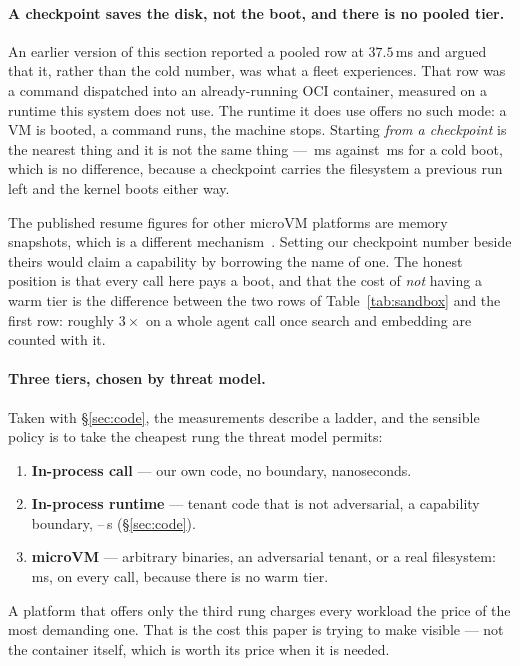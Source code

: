 \paragraph{A checkpoint saves the disk, not the boot, and there is no pooled
tier.}
An earlier version of this section reported a pooled row at $37.5$\,ms and argued
that it, rather than the cold number, was what a fleet experiences. That row was
a command dispatched into an already-running OCI container, measured on a runtime
this system does not use. The runtime it does use offers no such mode: a VM is
booted, a command runs, the machine stops. Starting \emph{from a checkpoint} is
the nearest thing and it is not the same thing --- \rVmCkpt{}\,ms against
\rVm{}\,ms for a cold boot, which is no difference, because a checkpoint carries
the filesystem a previous run left and the kernel boots either way.

The published resume figures for other microVM platforms are memory snapshots,
which is a different mechanism~\cite{e2b}. Setting our checkpoint number beside
theirs would claim a capability by borrowing the name of one. The honest position
is that every call here pays a boot, and that the cost of \emph{not} having a
warm tier is the difference between the two rows of Table~\ref{tab:sandbox} and
the first row: roughly $3\times$ on a whole agent call once search and embedding
are counted with it.

\paragraph{Three tiers, chosen by threat model.}
Taken with \S\ref{sec:code}, the measurements describe a ladder, and the sensible
policy is to take the cheapest rung the threat model permits:

\begin{enumerate}[leftmargin=*]
\item \textbf{In-process call} --- our own code, no boundary, nanoseconds.
\item \textbf{In-process runtime} --- tenant code that is not adversarial, a
  capability boundary, \rWazero{}--\rGpython{}\,\textmu s (\S\ref{sec:code}).
\item \textbf{microVM} --- arbitrary binaries, an adversarial tenant, or a real
  filesystem: \rVm{}\,ms, on every call, because there is no warm tier.
\end{enumerate}

A platform that offers only the third rung charges every workload the price of
the most demanding one. That is the cost this paper is trying to make visible ---
not the container itself, which is worth its price when it is needed.
